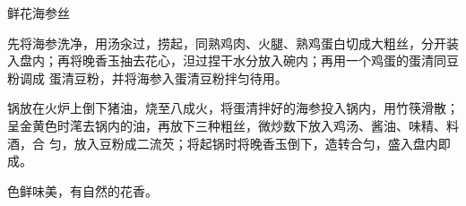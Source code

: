 %
%
%
%
%
%
%
\begin{recipe}{鲜花海参丝}

\ingredients


\preparation

\step 先将海参洗净，用汤汆过，捞起，同熟鸡肉、火腿、熟鸡蛋白切成大粗丝，分开装
入盘内；再将晚香玉抽去花心，泹过捏干水分放入碗内；再用一个鸡蛋的蛋清同豆粉调成
蛋清豆粉，并将海参入蛋清豆粉拌匀待用。

\step 锅放在火炉上倒下猪油，烧至八成火，将蛋清拌好的海参投入锅内，用竹筷滑散；
呈金黄色时滗去锅内的油，再放下三种粗丝，微炒数下放入鸡汤、酱油、味精、料酒，合
匀，放入豆粉成二流芡；将起锅时将晚香玉倒下，造转合匀，盛入盘内即成。

\features

色鲜味美，有自然的花香。

\end{recipe}

